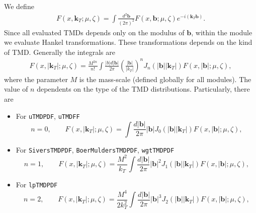\documentclass[prd,nofootinbib,eqsecnum,final]{revtex4}
\renewcommand{\(}{\left(}
\renewcommand{\)}{\right)}
\renewcommand{\[}{\left[}
\renewcommand{\]}{\right]}
\renewcommand{\vec}[1]{\bm{#1}}
\begin{document}
We define
\begin{eqnarray}
F(x,\vec k_T;\mu,\zeta)=\int \frac{d^2\vec b}{(2\pi)^2}F(x,\vec b;\mu,\zeta)e^{-i(\vec k_T \vec b)}.
\end{eqnarray}
Since all evaluated TMDs depends only on the modulus of $\vec b$, within the module we evaluate Hankel transformations. These transformations depends on the kind of TMD. Generally the integrals are
\begin{eqnarray}\label{kT-J0}
F(x,|\vec k_T|;\mu,\zeta)=\frac{M^{2n}}{n!}\int \frac{|b|d|\vec b|}{2\pi} \(\frac{|\vec  b|}{|k_T|}\)^{n} J_n(|\vec b||\vec k_T|) F(x,|\vec b|;\mu,\zeta),
\end{eqnarray}
where the parameter $M$ is the mass-scale (defined globally for all modules). The value of $n$ dependents on the type of the TMD distributions. Particularly, there are
\begin{itemize}
\item For \texttt{uTMDPDF}, \texttt{uTMDFF}
$$
n=0,\qquad F(x,|\vec k_T|;\mu,\zeta)=\int \frac{d|\vec b|}{2\pi}|\vec  b| J_0(|\vec b||\vec k_T|) F(x,|\vec b|;\mu,\zeta),
$$

\item For \texttt{SiversTMDPDF}, \texttt{BoerMuldersTMDPDF}, \texttt{wgtTMDPDF}
$$
n=1,\qquad F(x,|\vec k_T|;\mu,\zeta)=\frac{M^2}{k_T}\int \frac{d|\vec b|}{2\pi}|\vec  b|^2 J_1(|\vec b||\vec k_T|) F(x,|\vec b|;\mu,\zeta),
$$

\item For \texttt{lpTMDPDF}
$$
n=2,\qquad F(x,|\vec k_T|;\mu,\zeta)=\frac{M^4}{2k_T^2}\int \frac{d|\vec b|}{2\pi}|\vec  b|^3 J_2(|\vec b||\vec k_T|) F(x,|\vec b|;\mu,\zeta),
$$
\end{itemize}
\end{document}
